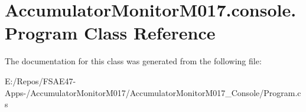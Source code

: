 \hypertarget{class_accumulator_monitor_m017_1_1console_1_1_program}{}\section{Accumulator\+Monitor\+M017.\+console.\+Program Class Reference}
\label{class_accumulator_monitor_m017_1_1console_1_1_program}


The documentation for this class was generated from the following file\+:\begin{DoxyCompactItemize}
\item 
E\+:/\+Repos/\+F\+S\+A\+E47-\/\+Apps-\//\+Accumulator\+Monitor\+M017/\+Accumulator\+Monitor\+M017\+\_\+\+Console/Program.\+cs\end{DoxyCompactItemize}

